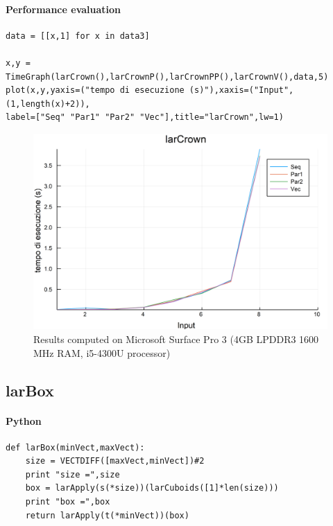 \documentclass{article}
\begin{document}
\paragraph{Performance evaluation}

\begin{Verbatim}
data = [[x,1] for x in data3]

x,y = TimeGraph(larCrown(),larCrownP(),larCrownPP(),larCrownV(),data,5)
plot(x,y,yaxis=("tempo di esecuzione (s)"),xaxis=("Input",(1,length(x)+2)),
label=["Seq" "Par1" "Par2" "Vec"],title="larCrown",lw=1)

\end{Verbatim}

\begin{figure}[htbp] 
\centering 
\includegraphics[scale=.13]{larCrownTime.png} 
\caption{Results computed on Microsoft Surface Pro  3 (4GB LPDDR3 1600 MHz RAM, i5-4300U processor)} 
\end{figure}
\subsection{larBox}

\paragraph{Python}

\begin{verbatim}
def larBox(minVect,maxVect):
    size = VECTDIFF([maxVect,minVect])#2
    print "size =",size
    box = larApply(s(*size))(larCuboids([1]*len(size)))
    print "box =",box
    return larApply(t(*minVect))(box)
\end{verbatim}
\end{document}
